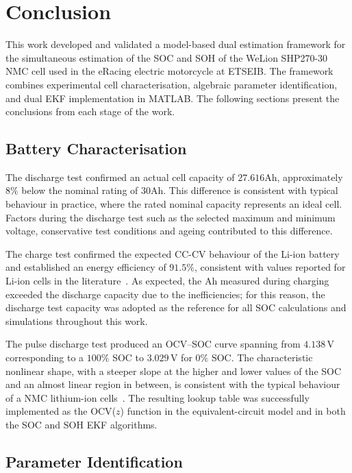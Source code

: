 \chapter{Conclusion}\label{sec:Conclusion}

This work developed and validated a model-based dual estimation framework for the simultaneous 
estimation of the \ac{SOC} and \ac{SOH} of the WeLion SHP270-30 \ac{NMC} cell used in the eRacing 
electric motorcycle at ETSEIB. The framework combines experimental cell characterisation, 
algebraic parameter identification, and dual \ac{EKF} implementation in MATLAB. 
The following sections present the conclusions from each stage of the work.

\section{Battery Characterisation}

The discharge test confirmed an actual cell capacity of $27.616 \text{Ah}$, approximately $8\%$ below 
the nominal rating of $30 \text{Ah}$. This difference is consistent with typical behaviour in 
practice, where the rated nominal capacity represents an ideal cell. Factors during the discharge test 
such as the selected maximum and minimum voltage, conservative test conditions and ageing contributed to this difference.

The charge test confirmed the expected \ac{CC-CV} behaviour of the \ac{Li-ion} battery and established 
an energy efficiency of $91.5\%$, consistent with values reported for \ac{Li-ion} cells in 
the literature~\cite{ma16176063}. As expected, the Ah measured during charging exceeded the 
discharge capacity due to the inefficiencies; for this reason, the discharge test capacity was 
adopted as the reference for all \ac{SOC} calculations and simulations throughout this work.

The pulse discharge test produced an \ac{OCV}--\ac{SOC} curve spanning from $4.138\,\text{V}$ corresponding to a  
$100\%$ \ac{SOC} to $3.029\,\text{V}$ for $0\%$ \ac{SOC}. The characteristic nonlinear shape, with a
steeper slope at the higher and lower values of the \ac{SOC} and an almost linear region in between, 
is consistent with the typical behaviour of a \ac{NMC} lithium-ion cells~\cite{HassanTantaNMC}. 
The resulting lookup table was successfully implemented as the \ac{OCV}($z$) function in the 
equivalent-circuit model and in both the \ac{SOC} and \ac{SOH} \ac{EKF} algorithms.

\section{Parameter Identification}

